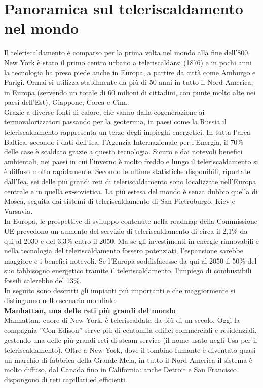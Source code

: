 \documentclass[laurea,oneside,11pt]{USiena_tesiLM3}
\begin{document}
\section{Panoramica sul teleriscaldamento nel mondo}
Il teleriscaldamento è comparso per la prima volta nel mondo alla fine dell'800. New York è stato il primo centro urbano a teleriscaldarsi (1876) e in pochi anni la tecnologia ha preso piede anche in Europa, a partire da città come Amburgo e Parigi.
Ormai si utilizza stabilmente da più di 50 anni in tutto il Nord America, in Europa (servendo un totale di 60 milioni di cittadini, con punte molto alte nei paesi dell'Est), Giappone, Corea e Cina.\\

Grazie a diverse fonti di calore, che vanno dalla cogenerazione ai termovalorizzatori passando per la geotermia, in paesi come la Russia il teleriscaldamento rappresenta un terzo degli impieghi energetici. In tutta l'area Baltica, secondo i dati dell'Iea, l'Agenzia Internazionale per l'Energia, il 70\% delle case è scaldato grazie a questa tecnologia. Sicuro e dai notevoli benefici ambientali, nei paesi in cui l'inverno è molto freddo e lungo il teleriscaldamento si è diffuso molto rapidamente. Secondo le ultime statistiche disponibili, riportate dall'Iea, sei delle più grandi reti di teleriscaldamento sono localizzate nell'Europa centrale e in quella ex-sovietica. La più estesa del mondo è senza dubbio quella di Mosca, seguita dai sistemi di teleriscaldamento di San Pietroburgo, Kiev e Varsavia. \\

In Europa, le prospettive di sviluppo contenute nella roadmap della Commissione UE prevedono un aumento del servizio di teleriscaldamento di circa il 2,1\% da qui al 2030 e del 3,3\% entro il 2050. Ma se gli investimenti in energie rinnovabili e nella tecnologia del teleriscaldamento fossero potenziati, l'espansione sarebbe maggiore e i benefici notevoli. Se l'Europa soddisfacesse da qui al 2050 il 50\% del suo fabbisogno energetico tramite il teleriscaldamento, l'impiego di combustibili fossili calerebbe del 13\%.\\

In seguito sono descritti gli impianti più importanti e che maggiormente si distinguono nello scenario mondiale.\\

\noindent\textbf{Manhattan, una delle reti più grandi del mondo}\\
\noindent Manhattan, cuore di New York, è teleriscaldata da più di un secolo. Oggi la compagnia ''Con Edison'' serve più di centomila edifici commerciali e residenziali, gestendo una delle più grandi reti di steam service (il nome usato negli Usa per il teleriscaldamento). Oltre a New York, dove il tombino fumante è diventato quasi un marchio di fabbrica della Grande Mela, in tutto il Nord America il sistema è molto diffuso, dal Canada fino in California: anche Detroit e San Francisco dispongono di reti capillari ed efficienti.\\
\end{document}
